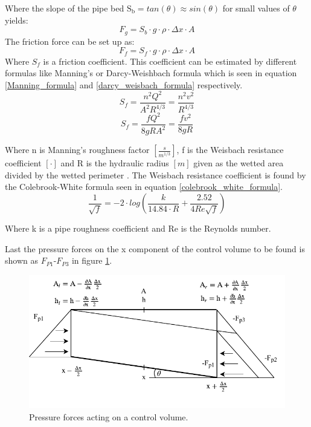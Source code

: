 Where the slope of the pipe bed $\text{S}_\text{b} = tan(\theta) \approx sin(\theta)$ for small values of $\theta$ yields:
\begin{equation}
F_g = S_b \cdot g \cdot \rho \cdot \Delta x \cdot A 
\end{equation}
The friction force can be set up as:
\begin{equation}
F_f = S_f \cdot g \cdot \rho \cdot \Delta x \cdot A 
\label{friction_force} 
\end{equation}
Where $S_f$ is a friction coefficient. This coefficient can be estimated by different formulas like Manning's or Darcy-Weishbach formula which is seen in equation \ref{Manning_formula} and \ref{darcy_weisbach_formula} respectively. 
\begin{equation}
	S_f = \frac{n^2 Q^2}{A^2R^{4/3}}= \frac{n^2 v^2}{R^{4/3}}
\label{Manning_formula}
\end{equation}
\begin{equation}
	S_f = \frac{f Q^2}{8gR A^2}= \frac{f v^2}{8gR}
\label{darcy_weisbach_formula}
\end{equation}

Where n is Manning's roughness factor $[ \frac{s}{m^{1/3}} ]$, f is the Weisbach resistance coefficient $[\cdot]$ and R is the hydraulic radius $[m]$ given as the wetted area divided by the wetted perimeter \cite{stormwatercollectionsystems}.
The Weisbach resistance coefficient is found by the Colebrook-White formula seen in equation \ref{colebrook_white_formula}.
\begin{equation}
\frac{1}{\sqrt{f}} = -2\cdot log \left( \frac{k}{14.84 \cdot R}+ \frac{2.52}{4 Re \sqrt{f}} \right)
\label{colebrook_white_formula}
\end{equation}

Where k is a pipe roughness coefficient and Re is the Reynolds number.

Last the pressure forces on the x component of the control volume to be found is shown as $F_{P1}$-$F_{P3}$ in figure \ref{fig:forces_on_CV}. 

\begin{figure}[H]
\centering
\includegraphics[width=1\textwidth]{report/modeling/pictures/Pressure_forces}
\caption{Pressure forces acting on a control volume. }
\label{fig:forces_on_CV}
\end{figure}

